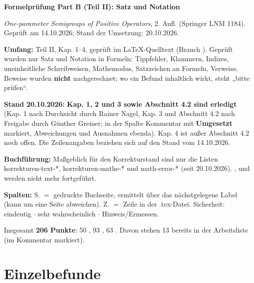 \documentclass[10pt]{article}
\begin{document}
{\Large\bfseries Formelprüfung Part B (Teil II): Satz und Notation\par}
\smallskip
\emph{One-parameter Semigroups of Positive Operators}, 2. Aufl. (Springer LNM 1184). Geprüft am 14.10.2026; Stand der Umsetzung: 20.10.2026.

\textbf{Umfang:} Teil II, Kap. 1–4, geprüft im LaTeX-Quelltext (Branch ). Geprüft wurden nur Satz und Notation in Formeln: Tippfehler, Klammern, Indizes, uneinheitliche Schreibweisen, Mathemodus, Satzzeichen an Formeln, Verweise. Beweise wurden \textbf{nicht} nachgerechnet; wo ein Befund inhaltlich wirkt, steht „bitte prüfen“.

\textbf{Stand 20.10.2026:} \textbf{Kap. 1, 2 und 3 sowie Abschnitt 4.2 sind erledigt} (Kap. 1 nach Durchsicht durch Rainer Nagel, Kap. 3 und Abschnitt 4.2 nach Freigabe durch Günther Greiner; in der Spalte Kommentar mit \textbf{Umgesetzt} markiert, Abweichungen und Ausnahmen ebenda). Kap. 4 ist außer Abschnitt 4.2 noch offen. Die Zeilenangaben beziehen sich auf den Stand vom 14.10.2026.

\textbf{Buchführung:} Maßgeblich für den Korrekturstand sind nur die Listen {korrekturen-text-*}, {korrekturen-mathe-*} und {math-error-*} (seit 20.10.2026). ,  und  werden nicht mehr fortgeführt.

\textbf{Spalten:} S. $=$ gedruckte Buchseite, ermittelt über das nächstgelegene Label (kann um eine Seite abweichen). Z. $=$ Zeile in der .tex-Datei. Sicherheit: \sichA{} eindeutig $\ensuremath{\cdot}$ \sichB{} sehr wahrscheinlich $\ensuremath{\cdot}$ \sichC{} Hinweis/Ermessen.

Insgesamt \textbf{206 Punkte}: 50 \sichA{}, 93 \sichB{}, 63 \sichC{}. Davon stehen 13 bereits in der Arbeitsliste  (im Kommentar markiert).

\section*{Einzelbefunde}
\end{document}
